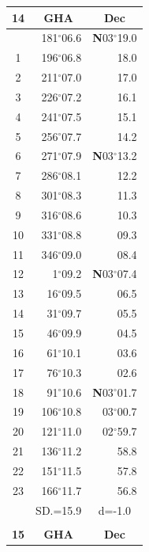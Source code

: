 \documentclass[10pt, a4paper]{report}
\begin{document}
\begin{scriptsize}
\noindent
\begin{tabular*}{0.2\textwidth}[t]{@{\extracolsep{\fill}}|c|rr|}
\hline
\multicolumn{1}{|c|}{\rule{0pt}{2.6ex}\textbf{14}} & \multicolumn{1}{c}{\textbf{GHA}} & \multicolumn{1}{c|}{\textbf{Dec}}\\
\hline\rule{0pt}{2.6ex}\noindent
0 & 181$^\circ$06.6 & \textbf{N}03$^\circ$19.0\\
1 & 196$^\circ$06.8 & 18.0\\
2 & 211$^\circ$07.0 & 17.0\\
3 & 226$^\circ$07.2 & \raisebox{0.24ex}{\boldmath$\cdot$~\boldmath$\cdot$~~}16.1\\
4 & 241$^\circ$07.5 & 15.1\\
5 & 256$^\circ$07.7 & 14.2\\[2Pt]
6 & 271$^\circ$07.9 & \textbf{N}03$^\circ$13.2\\
7 & 286$^\circ$08.1 & 12.2\\
8 & 301$^\circ$08.3 & 11.3\\
9 & 316$^\circ$08.6 & \raisebox{0.24ex}{\boldmath$\cdot$~\boldmath$\cdot$~~}10.3\\
10 & 331$^\circ$08.8 & 09.3\\
11 & 346$^\circ$09.0 & 08.4\\[2Pt]
12 & 1$^\circ$09.2 & \textbf{N}03$^\circ$07.4\\
13 & 16$^\circ$09.5 & 06.5\\
14 & 31$^\circ$09.7 & 05.5\\
15 & 46$^\circ$09.9 & \raisebox{0.24ex}{\boldmath$\cdot$~\boldmath$\cdot$~~}04.5\\
16 & 61$^\circ$10.1 & 03.6\\
17 & 76$^\circ$10.3 & 02.6\\[2Pt]
18 & 91$^\circ$10.6 & \textbf{N}03$^\circ$01.7\\
19 & 106$^\circ$10.8 & 03$^\circ$00.7\\
20 & 121$^\circ$11.0 & 02$^\circ$59.7\\
21 & 136$^\circ$11.2 & \raisebox{0.24ex}{\boldmath$\cdot$~\boldmath$\cdot$~~}58.8\\
22 & 151$^\circ$11.5 & 57.8\\
23 & 166$^\circ$11.7 & 56.8\\
\hline
\rule{0pt}{2.4ex} & \multicolumn{1}{c}{SD.=15.9} & \multicolumn{1}{c|}{d=-1.0}\\
\hline
\multicolumn{1}{c}{}\\[-0.5ex]\hline
\multicolumn{1}{|c|}{\rule{0pt}{2.6ex}\textbf{15}} & \multicolumn{1}{c}{\textbf{GHA}} & \multicolumn{1}{c|}{\textbf{Dec}}\\

\end{tabular*}
\end{scriptsize}
\end{document}
